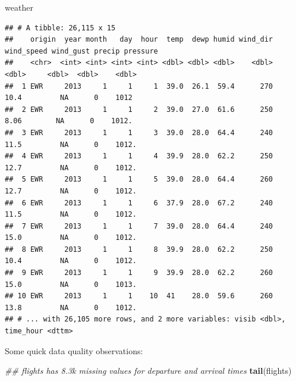 \documentclass[
]{article}
\newenvironment{Shaded}{\begin{snugshade}}{\end{snugshade}}
\newcommand{\CommentTok}[1]{\textcolor[rgb]{0.56,0.35,0.01}{\textit{#1}}}
\newcommand{\KeywordTok}[1]{\textcolor[rgb]{0.13,0.29,0.53}{\textbf{#1}}}
\newcommand{\NormalTok}[1]{#1}
\begin{document}
\begin{Shaded}
\begin{Highlighting}[]
\NormalTok{weather}
\end{Highlighting}
\end{Shaded}

\begin{verbatim}
## # A tibble: 26,115 x 15
##    origin  year month   day  hour  temp  dewp humid wind_dir wind_speed wind_gust precip pressure
##    <chr>  <int> <int> <int> <int> <dbl> <dbl> <dbl>    <dbl>      <dbl>     <dbl>  <dbl>    <dbl>
##  1 EWR     2013     1     1     1  39.0  26.1  59.4      270      10.4         NA      0    1012 
##  2 EWR     2013     1     1     2  39.0  27.0  61.6      250       8.06        NA      0    1012.
##  3 EWR     2013     1     1     3  39.0  28.0  64.4      240      11.5         NA      0    1012.
##  4 EWR     2013     1     1     4  39.9  28.0  62.2      250      12.7         NA      0    1012.
##  5 EWR     2013     1     1     5  39.0  28.0  64.4      260      12.7         NA      0    1012.
##  6 EWR     2013     1     1     6  37.9  28.0  67.2      240      11.5         NA      0    1012.
##  7 EWR     2013     1     1     7  39.0  28.0  64.4      240      15.0         NA      0    1012.
##  8 EWR     2013     1     1     8  39.9  28.0  62.2      250      10.4         NA      0    1012.
##  9 EWR     2013     1     1     9  39.9  28.0  62.2      260      15.0         NA      0    1013.
## 10 EWR     2013     1     1    10  41    28.0  59.6      260      13.8         NA      0    1012.
## # ... with 26,105 more rows, and 2 more variables: visib <dbl>, time_hour <dttm>
\end{verbatim}

Some quick data quality observations:

\begin{Shaded}
\begin{Highlighting}[]
\CommentTok{\#\# \textasciigrave{}flights\textasciigrave{} has 8.3k missing values for departure and arrival times}
\KeywordTok{tail}\NormalTok{(flights)}
\end{Highlighting}
\end{Shaded}
\end{document}
